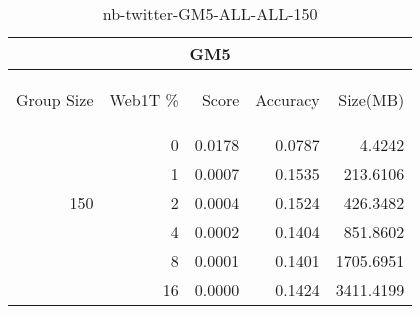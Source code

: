 \begin{center}
\begin{table}[htbp] 
 \begin{center}
\begin{tabular}{ | r | r | r | r | r |}
\hline
\multicolumn{5}{|c|}{GM5}\\
\hline
\begin{sideways}Group Size\end{sideways} & \begin{sideways}Web1T \%\end{sideways} & \begin{sideways}Score\end{sideways} & \begin{sideways}Accuracy\end{sideways} & \begin{sideways}Size(MB)\end{sideways}\\
\hline
\multirow{5}{*}{150}
 & 0 & 0.0178 & 0.0787 & 4.4242\\ \cline{2-5}
 & 1 & 0.0007 & 0.1535 & 213.6106\\ \cline{2-5}
 & 2 & 0.0004 & 0.1524 & 426.3482\\ \cline{2-5}
 & 4 & 0.0002 & 0.1404 & 851.8602\\ \cline{2-5}
 & 8 & 0.0001 & 0.1401 & 1705.6951\\ \cline{2-5}
 & 16 & 0.0000 & 0.1424 & 3411.4199\\ \cline{2-5}
\hline
\end{tabular}
\caption{nb-twitter-GM5-ALL-ALL-150}
\label{table:nb-twitter-GM5-ALL-ALL-150}
\end{center}
 \end{table}
\end{center}

